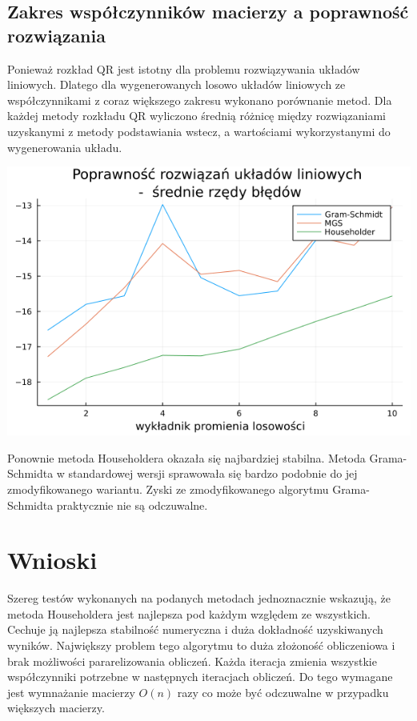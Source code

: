 \documentclass[11pt,wide]{mwart}
\begin{document}
\subsection{Zakres współczynników macierzy a poprawność rozwiązania}
Ponieważ rozkład QR jest istotny dla problemu rozwiązywania układów liniowych. Dlatego dla wygenerowanych losowo układów liniowych ze współczynnikami z coraz większego zakresu wykonano porównanie metod. Dla każdej metody rozkładu QR wyliczono średnią różnicę między rozwiązaniami uzyskanymi z metody podstawiania wstecz, a wartościami wykorzystanymi do wygenerowania układu.

\vspace{1cm}
\centerline{\includegraphics[scale=0.6]{linear6}}

Ponownie metoda Householdera okazała się najbardziej stabilna. Metoda Grama-Schmidta w standardowej wersji sprawowała się bardzo podobnie do jej zmodyfikowanego wariantu. Zyski ze zmodyfikowanego algorytmu Grama-Schmidta praktycznie nie są odczuwalne.


\section{Wnioski}

Szereg testów wykonanych na podanych metodach jednoznacznie wskazują, że metoda Householdera jest najlepsza pod każdym względem ze wszystkich. Cechuje ją najlepsza stabilność numeryczna i duża dokładność uzyskiwanych wyników. Największy problem tego algorytmu to duża złożoność obliczeniowa i brak możliwości pararelizowania obliczeń. Każda iteracja zmienia wszystkie współczynniki potrzebne w następnych iteracjach obliczeń. Do tego wymagane jest wymnażanie macierzy $O(n)$ razy co może być odczuwalne w przypadku większych macierzy.
\end{document}

